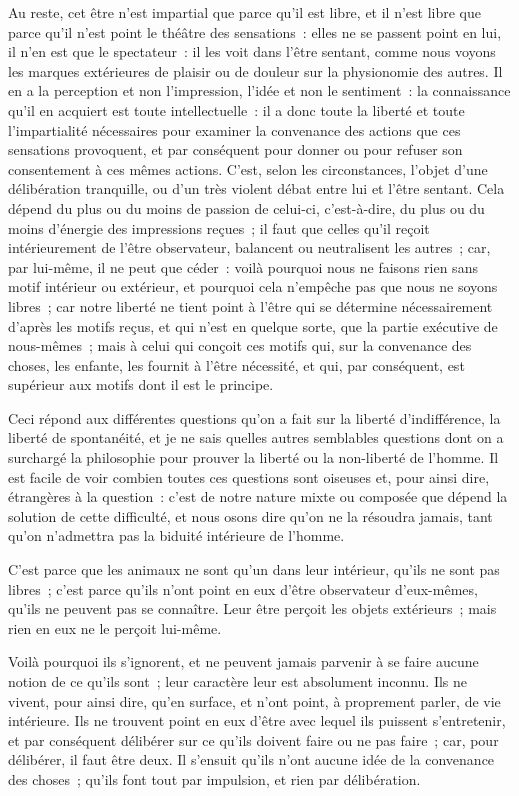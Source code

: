 \documentclass[french,twoside]{book} %
\begin{document}
Au reste, cet être n’est impartial que parce qu’il est libre, et il n’est libre que parce qu’il n’est point le théâtre des sensations : elles ne se passent point en lui, il n’en est que le spectateur : il les voit dans l’être sentant, comme nous voyons les marques extérieures de plaisir ou de douleur sur la physionomie des autres. Il en a la perception et non l’impression, l’idée et non le sentiment : la connaissance qu’il en acquiert est toute intellectuelle : il a donc toute la liberté et toute l’impartialité nécessaires pour examiner la convenance des actions que ces sensations provoquent, et par conséquent pour donner ou pour refuser son consentement à ces mêmes actions. C’est, selon les circonstances, l’objet d’une délibération tranquille, ou d’un très violent débat entre lui et l’être sentant. Cela dépend du plus ou du moins de passion de celui-ci, c’est-à-dire, du plus ou du moins d’énergie des impressions reçues ; il faut que celles qu’il reçoit intérieurement de l’être observateur, balancent ou neutralisent les autres ; car, par lui-même, il ne peut que céder : voilà pourquoi nous ne faisons rien sans motif intérieur ou extérieur, et pourquoi cela n’empêche pas que nous ne soyons libres ; car notre liberté ne tient point à l’être qui se détermine nécessairement d’après les motifs reçus, et qui n’est en quelque sorte, que la partie exécutive de nous-mêmes ; mais à celui qui conçoit ces motifs qui, sur la convenance des choses, les enfante, les fournit à l’être nécessité, et qui, par conséquent, est supérieur aux motifs dont il est le principe.\par
Ceci répond aux différentes questions qu’on a fait sur la liberté d’indifférence, la liberté de spontanéité, et je ne sais quelles autres semblables questions dont on a surchargé la philosophie pour prouver la liberté ou la non-liberté de l’homme. Il est facile de voir combien toutes ces questions sont oiseuses et, pour ainsi dire, étrangères à la question : c’est de notre nature mixte ou composée que dépend la solution de cette difficulté, et nous osons dire qu’on ne la résoudra jamais, tant qu’on n’admettra pas la biduité intérieure de l’homme.\par
C’est parce que les animaux ne sont qu’un dans leur intérieur, qu’ils ne sont pas libres ; c’est parce qu’ils n’ont point en eux d’être observateur d’eux-mêmes, qu’ils ne peuvent pas se connaître. Leur être perçoit les objets extérieurs ; mais rien en eux ne le perçoit lui-même.\par
Voilà pourquoi ils s’ignorent, et ne peuvent jamais parvenir à se faire aucune notion de ce qu’ils sont ; leur caractère leur est absolument inconnu. Ils ne vivent, pour ainsi dire, qu’en surface, et n’ont point, à proprement parler, de vie intérieure. Ils ne trouvent point en eux d’être avec lequel ils puissent s’entretenir, et par conséquent délibérer sur ce qu’ils doivent faire ou ne pas faire ; car, pour délibérer, il faut être deux. Il s’ensuit qu’ils n’ont aucune idée de la convenance des choses ; qu’ils font tout par impulsion, et rien par délibération.\par
\end{document}
